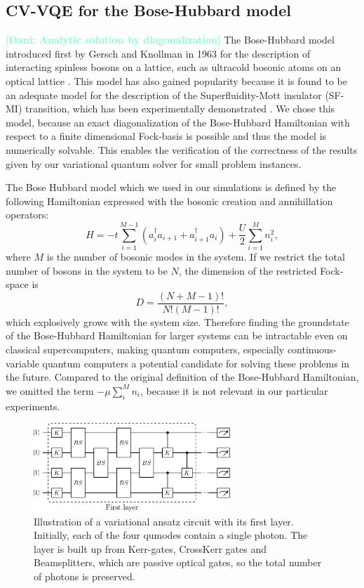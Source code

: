 \documentclass[12pt, a4paper,  nobibnotes]{article}
\newcommand{\nd}[1]{\textcolor{Aquamarine}{\textbf{[Dani: #1]}}}
\begin{document}
\subsection{CV-VQE for the Bose-Hubbard model}
\nd{Analytic solution by diagonalization}
The Bose-Hubbard model introduced first by Gersch and Knollman in 1963 for the description of interacting spinless bosons on a lattice, such as ultracold bosonic atoms on an optical lattice
\cite{BoseHubbardOriginal,ColdAtomtHubbard}. This model has also gained popularity because it is found to be an adequate model for the description of the Superfluidity-Mott insulator (SF-MI) transition, which has been experimentally demonstrated \cite{SuperfluidityMottTransition,Greiner2002}.
We chose this model, because an exact diagonalization of the Bose-Hubbard Hamiltonian with respect to a finite dimensional Fock-basis is possible and thus the model is numerically solvable. This enables the verification of the correctness of the results given by our variational quantum solver for small problem instances.
\par
The Bose Hubbard model which we used in our simulations is defined by the following Hamiltonian expressed with the bosonic creation and annihillation operators:
\begin{equation}
     H = -t\sum\limits_{i=1}^{M-1}( a_{i}^\dagger  a_{i+1} +  a_{i+1}^\dagger  a_{i}) + \frac{U}{2}\sum\limits_{i=1}^{M} n_i^2 ,
\end{equation}
where $M$ is the number of bosonic modes in the system. If we restrict the total number of bosons in the system to be $N$, the dimension of the restricted Fock-space is
\begin{equation}
    D = \frac{(N+M-1)!}{N!(M-1)!},
\end{equation}
which explosively grows with the system size. Therefore finding the groundstate of the Bose-Hubbard Hamiltonian for larger systems can be intractable even on classical supercomputers, making quantum computers, especially continuous-variable quantum computers a potential candidate for solving these problems in the future.
Compared to the original definition of the Bose-Hubbard Hamiltonian, we omitted the term $-\mu\sum\limits_{i}^{M} n_i$, because it is not relevant in our particular experiments.
\begin{figure}[H]
    \centering
    \includegraphics[width=0.66\textwidth]{figures/BH-Ansatz.pdf}
    \caption{Illustration of a variational ansatz circuit with its first layer. Initially, each of the four qumodes contain a
    single photon. The layer is built up from Kerr-gates, CrossKerr gates and Beamsplitters, which are passive optical gates, so the
    total number of photons is preserved.}
    \label{fig:single_layer_vqe}
\end{figure}
\end{document}
